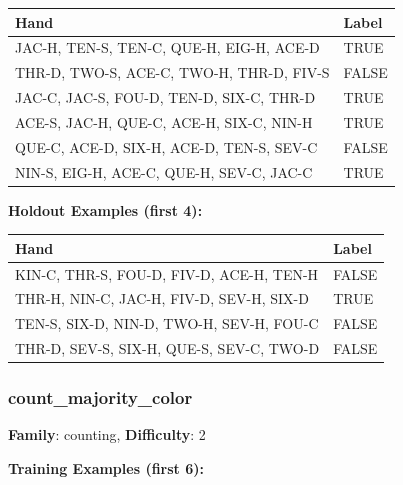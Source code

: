 \documentclass[10pt,a4paper]{article}
\begin{document}
\begin{small}
\begin{tabular}{p{8cm}l}
\toprule
Hand & Label \\
\midrule
JAC-H, TEN-S, TEN-C, QUE-H, EIG-H, ACE-D & \textcolor{positive}{TRUE} \\
THR-D, TWO-S, ACE-C, TWO-H, THR-D, FIV-S & \textcolor{negative}{FALSE} \\
JAC-C, JAC-S, FOU-D, TEN-D, SIX-C, THR-D & \textcolor{positive}{TRUE} \\
ACE-S, JAC-H, QUE-C, ACE-H, SIX-C, NIN-H & \textcolor{positive}{TRUE} \\
QUE-C, ACE-D, SIX-H, ACE-D, TEN-S, SEV-C & \textcolor{negative}{FALSE} \\
NIN-S, EIG-H, ACE-C, QUE-H, SEV-C, JAC-C & \textcolor{positive}{TRUE} \\
\bottomrule
\end{tabular}
\end{small}

\textbf{Holdout Examples (first 4):}

\begin{small}
\begin{tabular}{p{8cm}l}
\toprule
Hand & Label \\
\midrule
KIN-C, THR-S, FOU-D, FIV-D, ACE-H, TEN-H & \textcolor{negative}{FALSE} \\
THR-H, NIN-C, JAC-H, FIV-D, SEV-H, SIX-D & \textcolor{positive}{TRUE} \\
TEN-S, SIX-D, NIN-D, TWO-H, SEV-H, FOU-C & \textcolor{negative}{FALSE} \\
THR-D, SEV-S, SIX-H, QUE-S, SEV-C, TWO-D & \textcolor{negative}{FALSE} \\
\bottomrule
\end{tabular}
\end{small}

\vspace{0.5cm}

\subsubsection{count\_majority\_color}

\textbf{Family}: counting, \textbf{Difficulty}: 2

\textbf{Training Examples (first 6):}
\end{document}
